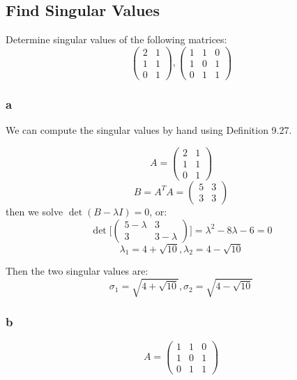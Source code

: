 \documentclass[12pt]{article} %
\newcommand{\1}[1]{\mathds{1}\left[#1\right]}
\begin{document}






\newpage
\subsection{Find Singular Values}
Determine singular values of the following matrices:
$$
\begin{pmatrix}
	2 & 1 \\
	1 & 1 \\
	0 & 1
\end{pmatrix}, 
\begin{pmatrix}
	1 & 1 & 0 \\
	1 & 0 & 1 \\
	0 & 1 & 1
\end{pmatrix}
$$	


\subsubsection{a}
We can compute the singular values by hand using Definition 9.27.

$$
	A = 
	\begin{pmatrix}
		2 & 1 \\
		1 & 1\\
		0 & 1
	\end{pmatrix}
$$
$$
	B = A^TA = 
	\begin{pmatrix}
		5 & 3 \\
		3 & 3
	\end{pmatrix}
$$ then we solve $\det(B - \lambda I) = 0$, or:
$$
	\det\bigg[\begin{pmatrix}
		5-\lambda & 3 \\
		3 & 3-\lambda
	\end{pmatrix}\bigg] = \lambda^2 - 8\lambda - 6 = 0
$$
$$
	\lambda_1 = 4+\sqrt{10}, \lambda_2 = 4-\sqrt{10}
$$

Then the two singular values are:
$$
	\sigma_1 = \sqrt{4+\sqrt{10}}, \sigma_2 = \sqrt{4-\sqrt{10}}
$$


\subsubsection{b}
$$
	A = 
	\begin{pmatrix}
		1 & 1 & 0\\
		1 & 0 & 1\\
		0 & 1 & 1
	\end{pmatrix}
$$
\end{document}
